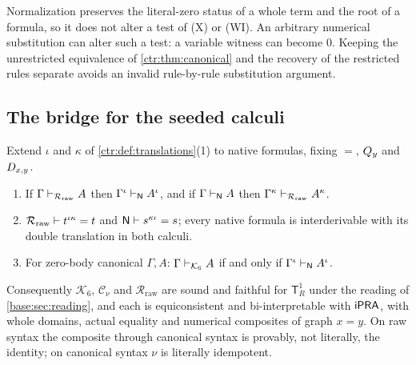 \begin{remark}
Normalization preserves the literal-zero status of a whole term and the root of a formula,
so it does not alter a test of (X) or (WI). An arbitrary numerical substitution can alter
such a test: a variable witness can become $0$. Keeping the unrestricted equivalence of
\cref{ctr:thm:canonical} and the recovery of the restricted rules separate avoids an invalid
rule-by-rule substitution argument.
\end{remark}

\subsection{The bridge for the seeded calculi}

\begin{theorem}\label{ctr:thm:sixbridge}
Extend $\iota$ and $\kappa$ of \cref{ctr:def:translations}(1) to native formulas, fixing
$=$, $Q_{y}$ and $D_{x,y}$.
\begin{enumerate}
\item If $\Gamma\vdash_{\mathcal R_{\mathrm{raw}}}A$ then $\Gamma^\iota\vdash_{\mathsf{N}}A^\iota$,
and if $\Gamma\vdash_{\mathsf{N}}A$ then $\Gamma^\kappa\vdash_{\mathcal R_{\mathrm{raw}}}A^\kappa$.
\item $\mathcal R_{\mathrm{raw}}\vdash t^{\iota\kappa}=t$ and $\mathsf{N}\vdash s^{\kappa\iota}=s$;
every native formula is interderivable with its double translation in both calculi.
\item For zero-body canonical $\Gamma,A$:
$\Gamma\vdash_{\mathcal K_6}A$ if and only if $\Gamma^\iota\vdash_{\mathsf{N}}A^\iota$.
\end{enumerate}
Consequently $\mathcal K_6$, $\mathcal C_\nu$ and $\mathcal R_{\mathrm{raw}}$ are sound and
faithful for $\mathsf T_R^1$ under the reading of \cref{base:sec:reading}, and each is
equiconsistent and bi-interpretable with $\mathsf{iPRA}$, with whole domains, actual equality and
numerical composites of graph $x=y$. On raw syntax the composite through canonical syntax is
provably, not literally, the identity; on canonical syntax $\nu$ is literally idempotent.
\end{theorem}
